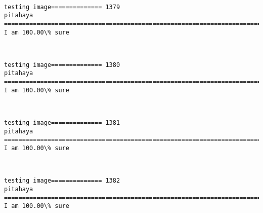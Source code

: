 \documentclass[11pt]{article}
\begin{document}
    \begin{center}
    \end{center}
    { \hspace*{\fill} \\}
    
    \begin{Verbatim}[commandchars=\\\{\}]
testing image============== 1379
pitahaya
============================================================================
I am 100.00\% sure

    \end{Verbatim}

    \begin{center}
    \end{center}
    { \hspace*{\fill} \\}
    
    \begin{Verbatim}[commandchars=\\\{\}]
testing image============== 1380
pitahaya
============================================================================
I am 100.00\% sure

    \end{Verbatim}

    \begin{center}
    \end{center}
    { \hspace*{\fill} \\}
    
    \begin{Verbatim}[commandchars=\\\{\}]
testing image============== 1381
pitahaya
============================================================================
I am 100.00\% sure

    \end{Verbatim}

    \begin{center}
    \end{center}
    { \hspace*{\fill} \\}
    
    \begin{Verbatim}[commandchars=\\\{\}]
testing image============== 1382
pitahaya
============================================================================
I am 100.00\% sure

    \end{Verbatim}
\end{document}
